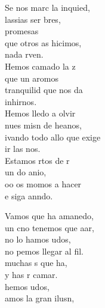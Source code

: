 \begin{cancion}%
	Se nos marc la inquied,\\
	lassias  ser bres,\\
	promesas\\
	que otros as hicimos,\\
	 nada rven.\\
	Hemos camado la z\\
	que un aromos\\
	  tranquilid que nos da\\
	 inhirnos.\\
	\jump
	Hemos lledo a olvir\\
	nues misn de heanos,\\
	ivando todo allo que exige\\
	ir las nos.\\
	Estamos rtos de r\\
	un do anio,\\
	oo os momos a hacer\\
	e siga anndo.\jump\\
	\begin{chorus}%
		Vamos que  ha amanedo,\\
		un cno tenemos que aar,\\
		no lo hamos udos,\\
		no pemos llegar al fil.\\
		 muchas s que ha,\\
		y has r camar.\\
		hemos udos,\\
		amos la gran ilusn,\\

\end{chorus}
\end{cancion}
